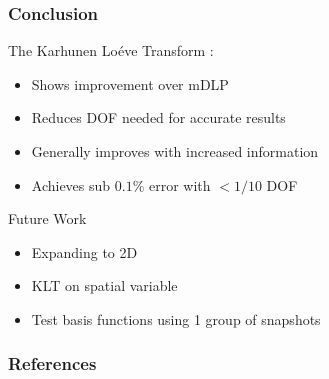 \documentclass[fleqn]{beamer}
\begin{document}
  \begin{frame}
    \frametitle{Conclusion}
    \begin{block}{The Karhunen Lo\'{e}ve Transform :}
      \begin{itemize}
	\item Shows improvement over mDLP
	\item Reduces DOF needed for accurate results
	\item Generally improves with increased information
	\item Achieves sub $0.1\%$ error with $<1/10$ DOF
      \end{itemize}
    \end{block}
    \begin{block}{Future Work}
      \begin{itemize}
	\item Expanding to 2D
	\item KLT on spatial variable
	\item Test basis functions using 1 group of snapshots
      \end{itemize}
    \end{block}
    \nocite{*}
  \end{frame}

  \begin{frame}[t,allowframebreaks]\label{lastframe}
    \frametitle{References}
    
    
  \end{frame}

  \beginbackup
\end{document}
